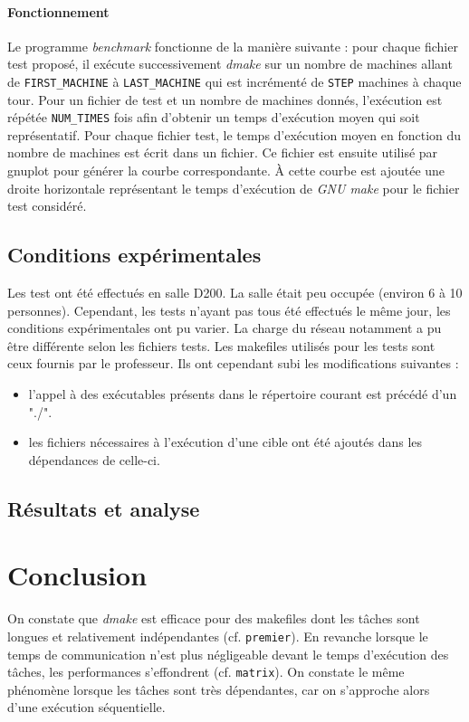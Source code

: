 \documentclass[a4paper,12pt,twoside]{article}
\begin{document}
\paragraph{Fonctionnement}

Le programme \emph{benchmark} fonctionne de la manière suivante : pour
chaque fichier test proposé, il exécute successivement \emph{dmake} sur un nombre de
machines allant de \texttt{FIRST\_MACHINE} à \texttt{LAST\_MACHINE}
qui est incrémenté de \texttt{STEP} machines à chaque tour. Pour un
fichier de test et un nombre de machines donnés, l'exécution est
répétée \texttt{NUM\_TIMES} fois afin d'obtenir un temps d'exécution moyen
qui soit représentatif. 
Pour chaque fichier test, le temps d'exécution moyen en fonction du
nombre de machines est écrit dans un fichier. Ce fichier est ensuite
utilisé par gnuplot pour générer la courbe correspondante. À cette
courbe est ajoutée une droite horizontale représentant le temps
d'exécution de \emph{GNU make} pour le fichier test considéré. 

\subsection{Conditions expérimentales}

Les test ont été effectués en salle D200. La salle était peu occupée
(environ 6 à 10 personnes). Cependant, les tests n'ayant pas tous été
effectués le même jour, les conditions expérimentales ont pu
varier. La charge du réseau notamment a pu être différente selon les
fichiers tests. Les makefiles utilisés pour les tests sont ceux
fournis par le professeur. Ils ont cependant subi les modifications
suivantes : 
\begin{itemize}
\item l'appel à des exécutables présents dans le répertoire courant est
  précédé d'un "./".
\item les fichiers nécessaires à l'exécution d'une cible ont été
  ajoutés dans les dépendances de celle-ci.
\end{itemize}

\subsection{Résultats et analyse}

\section*{Conclusion}
On constate que \emph{dmake} est efficace pour des makefiles dont les
tâches sont longues et relativement indépendantes
(cf. \texttt{premier}). En revanche lorsque le temps de communication
n'est plus négligeable devant le temps d'exécution des tâches, les
performances s'effondrent (cf. \texttt{matrix}). On constate le même phénomène lorsque les
tâches sont très dépendantes, car on s'approche alors d'une exécution séquentielle.
\end{document}
